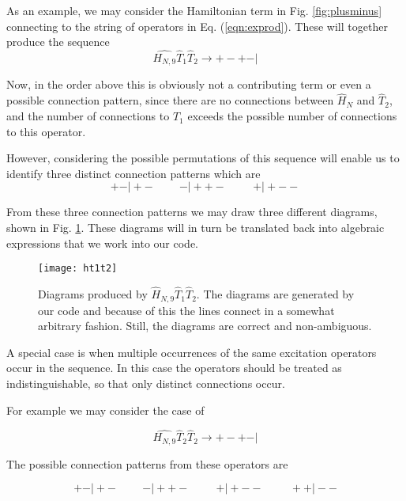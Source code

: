 As an example, we may consider the Hamiltonian term in Fig.
\ref{fig:plusminus} connecting to the string of operators in Eq.
(\ref{eqn:exprod}). These will together produce the sequence
\begin{equation}
\hat{H_{N,9}} \hat{T}_1 \hat{T}_2 \rightarrow  + - + - \vert 
\end{equation}

Now, in the order above this is obviously not a contributing term or
even a possible connection pattern, since there are no connections
between $\hat{H}_N$ and $\hat{T}_2$, and the number of connections to
$\hat{T}_1$ exceeds the possible number of connections to this
operator.

However, considering the possible permutations of this sequence will
enable us to identify three distinct connection patterns which are
\begin{equation}
  + -\vert  + - \hspace{1cm}  -\vert  + + -  \hspace{1cm}  + \vert  + - -
\end{equation}

From these three connection patterns we may draw three different
diagrams, shown in Fig. \ref{fig:ht1t2}. These diagrams will in turn be
translated back into algebraic expressions that we work into our code.
\begin{figure}
 \centering
  \texttt{[image: ht1t2]}
  \caption{Diagrams produced by $\hat{H}_{N,9} \hat{T}_1 \hat{T}_2
    $. The diagrams are generated by our code and because of this the
    lines connect in a somewhat arbitrary fashion. Still, the diagrams
    are correct and non-ambiguous.}
\label{fig:ht1t2}
\end{figure}

A special case is when multiple occurrences of the same excitation
operators occur in the sequence. In this case the operators should be
treated as indistinguishable, so that only distinct connections occur.

For example we may consider the case of 

\begin{equation}
\hat{H_{N,9}} \hat{T}_2 \hat{T}_2 \rightarrow  + - + - \vert 
\end{equation}

The possible connection patterns from these operators are

\begin{equation}
  + -\vert  + - \hspace{1cm}  -\vert  + + -  \hspace{1cm}  + \vert  + - - \hspace{1cm}  ++ \vert  - -
\label{eqn:firstconnect}
\end{equation}

